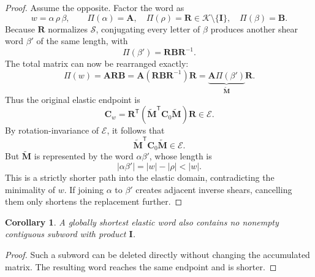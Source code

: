 \documentclass[11pt]{article}
\newcommand{\trans}{\mathsf{T}}
\newcommand{\E}{\mathcal E}
\newcommand{\K}{\mathcal K}
\newcommand{\Sset}{\mathcal S}
\newcommand{\wordprod}{\Pi}
\newtheorem{corollary}{Corollary}
\theoremstyle{definition}
\begin{document}
\begin{proof}
Assume the opposite.  Factor the word as
\begin{equation}
 w=\alpha\,\rho\,\beta,
 \qquad
 \wordprod(\alpha)=\mathbf A,
 \quad \wordprod(\rho)=\mathbf R\in\K\setminus\{\mathbf I\},
 \quad \wordprod(\beta)=\mathbf B.
\end{equation}
Because \(\mathbf R\) normalizes \(\Sset\), conjugating every letter of
\(\beta\) produces another shear word \(\beta'\) of the same length, with
\begin{equation}
 \wordprod(\beta')=\mathbf R\mathbf B\mathbf R^{-1}.
 \label{eq:conjugatedsuffix}
\end{equation}
The total matrix can now be rearranged exactly:
\begin{equation}
 \wordprod(w)=\mathbf A\mathbf R\mathbf B
 =\mathbf A(\mathbf R\mathbf B\mathbf R^{-1})\mathbf R
 =\underbrace{\mathbf A\wordprod(\beta')}_{\widetilde{\mathbf M}}
  \mathbf R.
 \label{eq:pushrotation}
\end{equation}
Thus the original elastic endpoint is
\begin{equation}
 \mathbf C_w
 =\mathbf R^\trans
  (\widetilde{\mathbf M}^\trans\mathbf C_0\widetilde{\mathbf M})
  \mathbf R\in\E.
\end{equation}
By rotation-invariance of \(\E\), it follows that
\begin{equation}
 \widetilde{\mathbf M}^\trans\mathbf C_0\widetilde{\mathbf M}\in\E.
\end{equation}
But \(\widetilde{\mathbf M}\) is represented by the word
\(\alpha\beta'\), whose length is
\begin{equation}
 |\alpha\beta'|=|w|-|\rho|<|w|.
\end{equation}
This is a strictly shorter path into the elastic domain, contradicting the
minimality of \(w\).  If joining \(\alpha\) to \(\beta'\) creates adjacent
inverse shears, cancelling them only shortens the replacement further.
\end{proof}

\begin{corollary}
A globally shortest elastic word also contains no nonempty contiguous
subword with product \(\mathbf I\).
\end{corollary}

\begin{proof}
Such a subword can be deleted directly without changing the accumulated
matrix.  The resulting word reaches the same endpoint and is shorter.
\end{proof}
\end{document}
